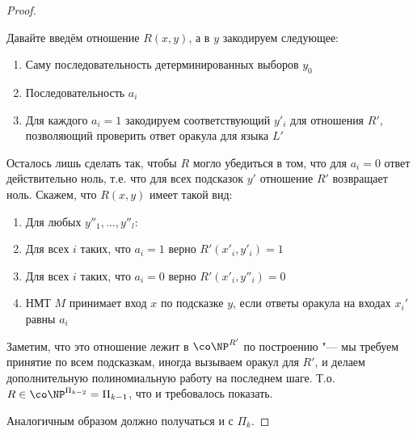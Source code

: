 \begin{proof}
\begin{description}
				Давайте введём отношение $R(x, y)$, а в $y$ закодируем следующее:
				\begin{enumerate}
					\item Саму последовательность детерминированных выборов $y_0$
					\item Последовательность $a_i$
					\item Для каждого $a_i=1$ закодируем соответствующий $y'_i$ для отношения $R'$, позволяющий проверить ответ оракула для языка $L'$
				\end{enumerate}
				Осталось лишь сделать так, чтобы $R$ могло убедиться в том, что для $a_i=0$ ответ действительно ноль, т.е. что для всех подсказок $y'$ отношение $R'$ возвращает ноль.
				Скажем, что $R(x, y)$ имеет такой вид:
				\begin{enumerate}
					\item Для любых $y''_1, \dots, y''_l$:
					\item Для всех $i$ таких, что $a_i=1$ верно $R'(x'_i, y'_i)=1$
					\item Для всех $i$ таких, что $a_i=0$ верно $R'(x'_i, y''_i)=0$
					\item НМТ $M$ принимает вход $x$ по подсказке $y$, если ответы оракула на входах $x_i'$ равны $a_i$
				\end{enumerate}
				Заметим, что это отношение лежит в $\co\NP^{R'}$ по построению "--- мы требуем принятие по всем подсказкам, иногда вызываем оракул для $R'$, и делаем дополнительную полиномиальную работу на последнем шаге.
				Т.о. $R \in \co\NP^{\Pi_{k-2}} = \Pi_{k-1}$, что и требовалось показать.
		\end{description}
		Аналогичным образом должно получаться и с $\Pi_k$.
		\TODO
	\end{proof}

